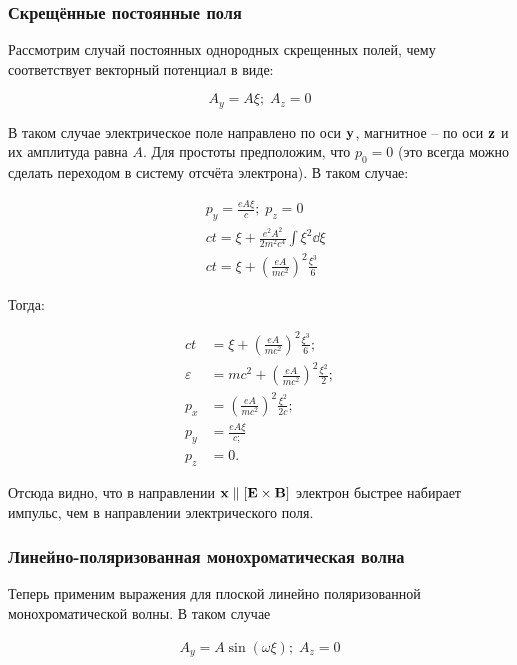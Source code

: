 \documentclass[10pt, a4paper]{article}
\begin{document}
\subsubsection{Скрещённые постоянные поля}

Рассмотрим случай постоянных однородных скрещенных полей, чему соответствует векторный потенциал в виде:

\begin{equation*}
	A_y = A\xi; \; A_z = 0
\end{equation*}

В таком случае электрическое поле направлено по оси $\vb{y}$, магнитное -- по оси $\vb{z}$ и их амплитуда равна $A$. Для простоты предположим, что $p_0 = 0$ (это всегда можно сделать переходом в систему отсчёта электрона). В таком случае:

\begin{align*}
	&p_y = \frac{eA\xi}{c};\; p_z = 0 \\
	&ct = \xi + \frac{e^2A^2}{2m^2c^4}\int\limits {\xi}^2\dd\xi \\
	&ct = \xi + \left( \frac{e A}{mc^2} \right)^2 \frac{\xi^3}{6}
\end{align*}

Тогда:

\begin{align*}
	ct &= \xi + \left( \frac{e A}{mc^2} \right)^2 \frac{\xi^3}{6}; \\
	\varepsilon &= mc^2 + \left( \frac{e A}{mc^2} \right)^2\frac{\xi^2}{2}; \\
	p_x &= \left( \frac{e A}{mc^2} \right)^2\frac{\xi^2}{2c}; \\
	p_y &= \frac{eA\xi}{c;} \\
	p_z &= 0 .
\end{align*}

Отсюда видно, что в направлении $\vb{x}\parallel[\vb{E}\times\vb{B}]$ электрон быстрее набирает импульс, чем в направлении электрического поля.

\subsubsection{Линейно-поляризованная монохроматическая волна}

Теперь применим выражения для плоской линейно поляризованной монохроматической волны. В таком случае

\begin{align*}
	A_y = A\sin\left( \omega \xi \right);\;A_z = 0
\end{align*}
\end{document}

